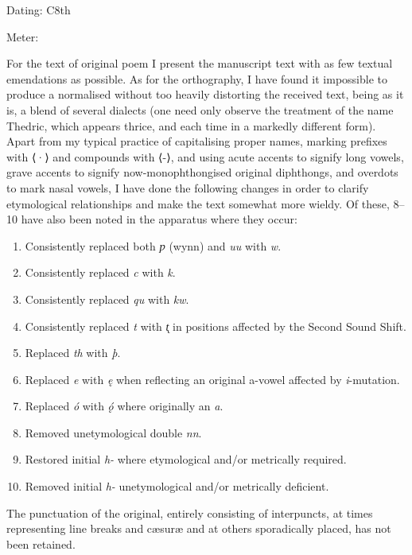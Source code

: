 
\begin{flushright}%
Dating: C8th

Meter: \Fornyrdislag%
\end{flushright}%


For the text of original poem I present the manuscript text with as few textual emendations as possible. As for the orthography, I have found it impossible to produce a normalised without too heavily distorting the received text, being as it is, a blend of several dialects (one need only observe the treatment of the name Thedric, which appears thrice, and each time in a markedly different form). Apart from my typical practice of capitalising proper names, marking prefixes with ⟨·⟩ and compounds with ⟨-⟩, and using acute accents to signify long vowels, grave accents to signify now-monophthongised original diphthongs, and overdots to mark nasal vowels, I have done the following changes in order to clarify etymological relationships and make the text somewhat more wieldy. Of these, 8–10 have also been noted in the apparatus where they occur:
\begin{enumerate}
  \item Consistently replaced both \emph{ƿ} (wynn) and \emph{uu} with \emph{w}.
  \item Consistently replaced \emph{c} with \emph{k}.
  \item Consistently replaced \emph{qu} with \emph{kw}.
  \item Consistently replaced \emph{t} with \emph{t̨} in positions affected by the Second Sound Shift.
  \item Replaced \emph{th} with \emph{þ}.
  \item Replaced \emph{e} with \emph{ę} when reflecting an original a-vowel affected by \emph{i}-mutation.
  \item Replaced \emph{ó} with \emph{ǫ́} where originally an \emph{a}.
  \item Removed unetymological double \emph{nn}.
  \item Restored initial \emph{h-} where etymological and/or metrically required.
  \item Removed initial \emph{h-} unetymological and/or metrically deficient.
\end{enumerate}

The punctuation of the original, entirely consisting of interpuncts, at times representing line breaks and cæsuræ and at others sporadically placed, has not been retained.

